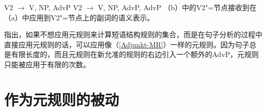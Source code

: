 \eal
\ex V2 $\to$ V, NP, AdvP
\ex V2 $\to$ V, NP, AdvP, AdvP
\zl
（b）中的V2"=节点接收到在（a）中应用到V2"=节点上的副词的语义表示。

\citet{WP92b}指出，如果不想应用元规则来计算短语结构规则的集合，而是在句子分析的过程中直接应用元规则的话，可以应用像（\ref{Adjunkt-MR}）一样的元规则。因为句子总是有限长度的，而且元规则在新允准的规则的右边引入一个额外的AdvP，元规则只能被应用于有限的次数。

\section{作为元规则的被动}
\label{sec-passive-gpsg}

